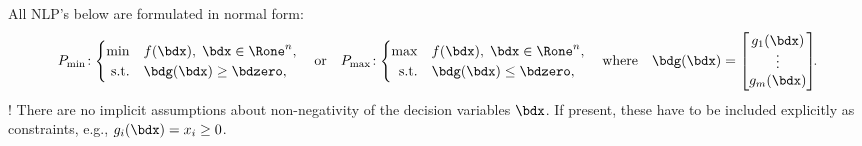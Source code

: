 \documentclass[a4paper]{article}
\begin{document}
  All NLP's below are formulated in normal form:
  \[
    P_{\min}\!:
    \begin{cases}
      \min        & f(\bdx),\; \bdx\in\Rone^n, \\
      \hfill
      \text{s.t.} & \bdg(\bdx)\ge\bdzero,
    \end{cases}
    \quad
    \text{or}
    \quad
    P_{\max}\!:
    \begin{cases}
      \max        & f(\bdx),\; \bdx\in\Rone^n, \\
      \hfill
      \text{s.t.} & \bdg(\bdx)\le\bdzero,
    \end{cases}
    \quad
    \text{where}
    \quad
    \bdg(\bdx)
    =
    \begin{bmatrix}
      g_1(\bdx)\\[-2pt] \vdots\\ g_m(\bdx)
    \end{bmatrix}
    \mkern-6mu.
  \]
 \Obs! There are no implicit assumptions about non-negativity of the decision variables $\bdx$.
 If present, these have to be included explicitly as constraints, e.g., $g_i(\bdx)=x_i\ge0$.
\end{document}
